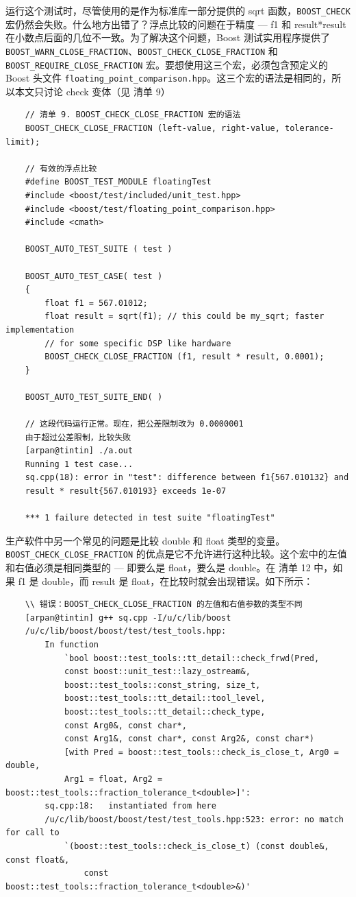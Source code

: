 \documentclass[UTF8,a4paper,12pt]{ctexbook}
\begin{document}
			 运行这个测试时，尽管使用的是作为标准库一部分提供的 sqrt 函数，\verb|BOOST_CHECK| 宏仍然会失败。什么地方出错了？浮点比较的问题在于精度 — f1 和 result*result 在小数点后面的几位不一致。为了解决这个问题，Boost 测试实用程序提供了 \verb|BOOST_WARN_CLOSE_FRACTION|、\verb|BOOST_CHECK_CLOSE_FRACTION| 和 \verb|BOOST_REQUIRE_CLOSE_FRACTION| 宏。要想使用这三个宏，必须包含预定义的 Boost 头文件 \verb|floating_point_comparison.hpp|。这三个宏的语法是相同的，所以本文只讨论 check 变体（见 清单 9）
			 \begin{lstlisting}
	// 清单 9. BOOST_CHECK_CLOSE_FRACTION 宏的语法
	BOOST_CHECK_CLOSE_FRACTION (left-value, right-value, tolerance-limit);
	
	// 有效的浮点比较
	#define BOOST_TEST_MODULE floatingTest
	#include <boost/test/included/unit_test.hpp>
	#include <boost/test/floating_point_comparison.hpp>
	#include <cmath>
	
	BOOST_AUTO_TEST_SUITE ( test ) 
	
	BOOST_AUTO_TEST_CASE( test )
	{
		float f1 = 567.01012;
		float result = sqrt(f1); // this could be my_sqrt; faster implementation
		// for some specific DSP like hardware
		BOOST_CHECK_CLOSE_FRACTION (f1, result * result, 0.0001);  
	}
	
	BOOST_AUTO_TEST_SUITE_END( )
	
	// 这段代码运行正常。现在，把公差限制改为 0.0000001
	由于超过公差限制，比较失败
	[arpan@tintin] ./a.out
	Running 1 test case...
	sq.cpp(18): error in "test": difference between f1{567.010132} and 
	result * result{567.010193} exceeds 1e-07
	
	*** 1 failure detected in test suite "floatingTest"
			 \end{lstlisting}
			 生产软件中另一个常见的问题是比较 double 和 float 类型的变量。\verb|BOOST_CHECK_CLOSE_FRACTION| 的优点是它不允许进行这种比较。这个宏中的左值和右值必须是相同类型的 — 即要么是 float，要么是 double。在 清单 12 中，如果 f1 是 double，而 result 是 float，在比较时就会出现错误。如下所示：
			 \begin{lstlisting}
	\\ 错误：BOOST_CHECK_CLOSE_FRACTION 的左值和右值参数的类型不同
	[arpan@tintin] g++ sq.cpp -I/u/c/lib/boost
	/u/c/lib/boost/boost/test/test_tools.hpp: 
		In function 
			`bool boost::test_tools::tt_detail::check_frwd(Pred, 
			const boost::unit_test::lazy_ostream&, 
			boost::test_tools::const_string, size_t, 
			boost::test_tools::tt_detail::tool_level, 
			boost::test_tools::tt_detail::check_type, 
			const Arg0&, const char*, 
			const Arg1&, const char*, const Arg2&, const char*) 
			[with Pred = boost::test_tools::check_is_close_t, Arg0 = double, 
			Arg1 = float, Arg2 = boost::test_tools::fraction_tolerance_t<double>]':
		sq.cpp:18:   instantiated from here
		/u/c/lib/boost/boost/test/test_tools.hpp:523: error: no match for call to
			`(boost::test_tools::check_is_close_t) (const double&, const float&, 
				const boost::test_tools::fraction_tolerance_t<double>&)'
			 \end{lstlisting}
			 
\end{document}
